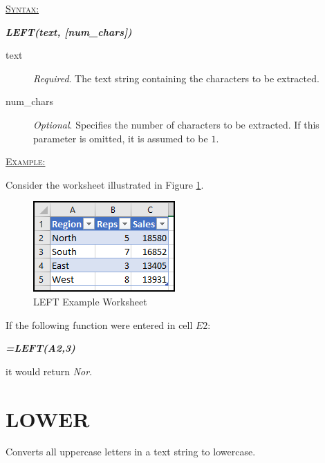 \begin{addmargin}[1cm]{0cm}
	
	\medskip
	\underline{\textsc{Syntax:}}
	\medskip
	
	{\color{Syntax}
		\noindent\textbf{\textit{LEFT(text, [num\_chars])}}
	}
	
	\begin{description}
		\item[text] \textit{Required}. The text string containing the characters to be extracted.
		\item[num\_chars] \textit{Optional}. Specifies the number of characters to be extracted. If this parameter is omitted, it is assumed to be $ 1 $.
	\end{description}

	\medskip
	\noindent\underline{\textsc{Example:}}
	\medskip
	
	\noindent Consider the worksheet illustrated in Figure \ref{apa:lef}.
	
	\begin{figure}[H]
		\centering
		\includegraphics[width=\maxwidth{.45\linewidth}]{gfx/apa_fig01}
		\caption{LEFT Example Worksheet}
		\label{apa:lef}
	\end{figure}
	
	\noindent If the following function were entered in cell $ E2 $:
	
	{\color{Syntax}
		\textit{\textbf{=LEFT(A2,3)}}
	}
	
	\noindent it would return \textit{Nor}.

\end{addmargin}

\section{LOWER}

Converts all uppercase letters in a text string to lowercase.

